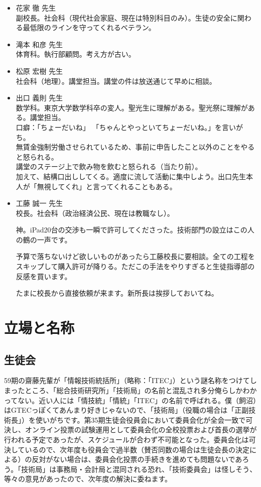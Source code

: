 \documentclass[dvipdfmx,jb5]{jreport}
\begin{document}
\begin{itemize}
      \item 花家 徹 先生\\
            副校長。社会科（現代社会家庭、現在は特別科目のみ）。生徒の安全に関わる最低限のラインを守ってくれるベテラン。

      \item 滝本 和彦 先生\\
            体育科。執行部顧問。考え方が古い。

      \item 松原 宏樹 先生\\
            社会科（地理）。講堂担当。講堂の件は放送通じて早めに相談。

      \item 出口 義則 先生\\
            数学科。東京大学数学科卒の変人。聖光生に理解がある。聖光祭に理解がある。講堂担当。
            \\口癖：「ちょーだいね」
            「ちゃんとやっといてちょーだいね。」を言いがち。\\
            無賃金強制労働させられているため、事前に申告したこと以外のことをやると怒られる。\\
            講堂のステージ上で飲み物を飲むと怒られる（当たり前）。\\
            加えて、結構口出ししてくる。適度に流して活動に集中しよう。出口先生本人が「無視してくれ」と言ってくれることもある。

      \item 工藤 誠一 先生\\
            校長。社会科（政治経済公民、現在は教職なし）。

            神。iPad20台の交渉も一瞬で許可してくださった。技術部門の設立はこの人の鶴の一声です。

            予算で落ちないけど欲しいものがあったら工藤校長に要相談。全ての工程をスキップして購入許可が降りる。ただこの手法をやりすぎると生徒指導部の反感を買います。

            たまに校長から直接依頼が来ます。新所長は挨拶しておいてね。
\end{itemize}

\section{立場と名称}
\subsection{生徒会}
59期の齋藤先輩が「情報技術統括所」（略称：「ITEC」）という謎名称をつけてしまったところ、「総合技術研究所」「技術局」の名前と混乱され多分俺らしかわかってない。近い人には「情技統」「情統」「ITEC」の名前で呼ばれる。僕（飼沼）はGTECっぽくてあんまり好きじゃないので、「技術局」（役職の場合は「正副技術長」）を使いがちです。第35期生徒会役員会において委員会化が全会一致で可決し、オンライン投票の試験運用として委員会化の全校投票および首長の選挙が行われる予定であったが、スケジュールが合わず不可能となった。委員会化は可決しているので、次年度も役員会で過半数（賛否同数の場合は生徒会長の決定による）の反対がない場合は、委員会化投票の手続きを進めても問題ないであろう。「技術局」は事務局・会計局と混同される恐れ、「技術委員会」は怪しそう、等々の意見があったので、次年度の解決に委ねます。
\end{document}
